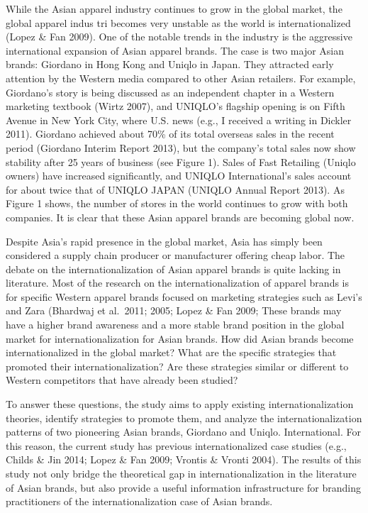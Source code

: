 \documentclass[12pt,]{article}
\begin{document}
While the Asian apparel industry continues to grow in the global market,
the global apparel indus tri becomes very unstable as the world is
internationalized (Lopez \& Fan 2009). One of the notable trends in the
industry is the aggressive international expansion of Asian apparel
brands. The case is two major Asian brands: Giordano in Hong Kong and
Uniqlo in Japan. They attracted early attention by the Western media
compared to other Asian retailers. For example, Giordano's story is
being discussed as an independent chapter in a Western marketing
textbook (Wirtz 2007), and UNIQLO's flagship opening is on Fifth Avenue
in New York City, where U.S. news (e.g., I received a writing in Dickler
2011). Giordano achieved about 70\% of its total overseas sales in the
recent period (Giordano Interim Report 2013), but the company's total
sales now show stability after 25 years of business (see Figure 1).
Sales of Fast Retailing (Uniqlo owners) have increased significantly,
and UNIQLO International's sales account for about twice that of UNIQLO
JAPAN (UNIQLO Annual Report 2013). As Figure 1 shows, the number of
stores in the world continues to grow with both companies. It is clear
that these Asian apparel brands are becoming global now.

Despite Asia's rapid presence in the global market, Asia has simply been
considered a supply chain producer or manufacturer offering cheap labor.
The debate on the internationalization of Asian apparel brands is quite
lacking in literature. Most of the research on the internationalization
of apparel brands is for specific Western apparel brands focused on
marketing strategies such as Levi's and Zara (Bhardwaj et al.~2011;
2005; Lopez \& Fan 2009; These brands may have a higher brand awareness
and a more stable brand position in the global market for
internationalization for Asian brands. How did Asian brands become
internationalized in the global market? What are the specific strategies
that promoted their internationalization? Are these strategies similar
or different to Western competitors that have already been studied?

To answer these questions, the study aims to apply existing
internationalization theories, identify strategies to promote them, and
analyze the internationalization patterns of two pioneering Asian
brands, Giordano and Uniqlo. International. For this reason, the current
study has previous internationalized case studies (e.g., Childs \& Jin
2014; Lopez \& Fan 2009; Vrontis \& Vronti 2004). The results of this
study not only bridge the theoretical gap in internationalization in the
literature of Asian brands, but also provide a useful information
infrastructure for branding practitioners of the internationalization
case of Asian brands.
\end{document}
